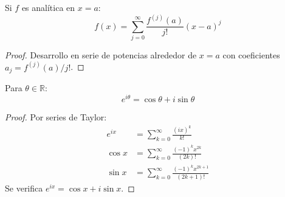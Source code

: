 \begin{lemma}
Si $f$ es analítica en $x=a$:
\[
f(x) = \sum_{j=0}^\infty \frac{f^{(j)}(a)}{j!} (x - a)^j
\]
\begin{proof}
Desarrollo en serie de potencias alrededor de $x=a$ con coeficientes $a_j = f^{(j)}(a)/j!$.
\end{proof}
\end{lemma}

\begin{theorem}\label{demformeuler}
Para $\theta \in \mathbb{R}$:
\[
e^{i\theta} = \cos \theta + i \sin \theta
\]
\begin{proof}
Por series de Taylor:
\begin{align*}
e^{ix} &= \sum_{k=0}^\infty \frac{(ix)^k}{k!} \\
\cos x &= \sum_{k=0}^\infty \frac{(-1)^k x^{2k}}{(2k)!} \\
\sin x &= \sum_{k=0}^\infty \frac{(-1)^k x^{2k+1}}{(2k+1)!}
\end{align*}
Se verifica $e^{ix} = \cos x + i \sin x$.
\end{proof}
\end{theorem}



 


